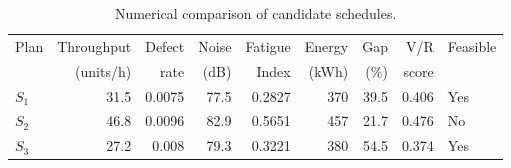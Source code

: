 \begin{table}[htbp]
\centering
\caption{Numerical comparison of candidate schedules.}
\label{tab:numerical-sim}
\small
\begin{tabular}{@{}lrrrrrrrl@{}}
\toprule
Plan & Throughput & Defect & Noise & Fatigue & Energy & Gap & V/R & Feasible \\
     & (units/h)  & rate   & (dB)  & Index   & (kWh)  & (\%) & score &         \\
\midrule
$S_{1}$ & 31.5 & 0.0075 & 77.5 & 0.2827 & 370 & 39.5 & 0.406 & Yes \\
$S_{2}$ & 46.8 & 0.0096 & 82.9 & 0.5651 & 457 & 21.7 & 0.476 & No \\
$S_{3}$ & 27.2 & 0.008 & 79.3 & 0.3221 & 380 & 54.5 & 0.374 & Yes \\
\bottomrule
\end{tabular}
\end{table}
